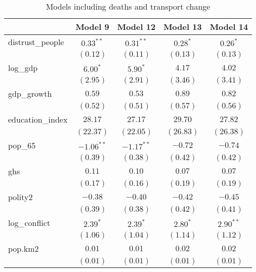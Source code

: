 \documentclass[
]{article}
\begin{document}
\begin{table}
\caption{Models including deaths and transport change}
\begin{center}
\begin{tabular}{l c c c c}
\hline
 & Model 9 & Model 12 & Model 13 & Model 14 \\
\hline
distrust\_people          & $0.33^{**}$  & $0.31^{**}$  & $0.28^{*}$    & $0.26^{*}$    \\
                          & $(0.12)$     & $(0.11)$     & $(0.13)$      & $(0.13)$      \\
log\_gdp                  & $6.00^{*}$   & $5.90^{*}$   & $4.17$        & $4.02$        \\
                          & $(2.95)$     & $(2.91)$     & $(3.46)$      & $(3.41)$      \\
gdp\_growth               & $0.59$       & $0.53$       & $0.89$        & $0.82$        \\
                          & $(0.52)$     & $(0.51)$     & $(0.57)$      & $(0.56)$      \\
education\_index          & $28.17$      & $27.17$      & $29.70$       & $27.82$       \\
                          & $(22.37)$    & $(22.05)$    & $(26.83)$     & $(26.38)$     \\
pop\_65                   & $-1.06^{**}$ & $-1.17^{**}$ & $-0.72$       & $-0.74$       \\
                          & $(0.39)$     & $(0.38)$     & $(0.42)$      & $(0.42)$      \\
ghs                       & $0.11$       & $0.10$       & $0.07$        & $0.07$        \\
                          & $(0.17)$     & $(0.16)$     & $(0.19)$      & $(0.19)$      \\
polity2                   & $-0.38$      & $-0.40$      & $-0.42$       & $-0.45$       \\
                          & $(0.39)$     & $(0.38)$     & $(0.42)$      & $(0.41)$      \\
log\_conflict             & $2.39^{*}$   & $2.39^{*}$   & $2.80^{*}$    & $2.90^{**}$   \\
                          & $(1.06)$     & $(1.04)$     & $(1.14)$      & $(1.12)$      \\
pop.km2                   & $0.01$       & $0.01$       & $0.02$        & $0.02$        \\
                          & $(0.01)$     & $(0.01)$     & $(0.01)$      & $(0.01)$      \\

\end{tabular}
\end{center}
\end{table}
\end{document}
